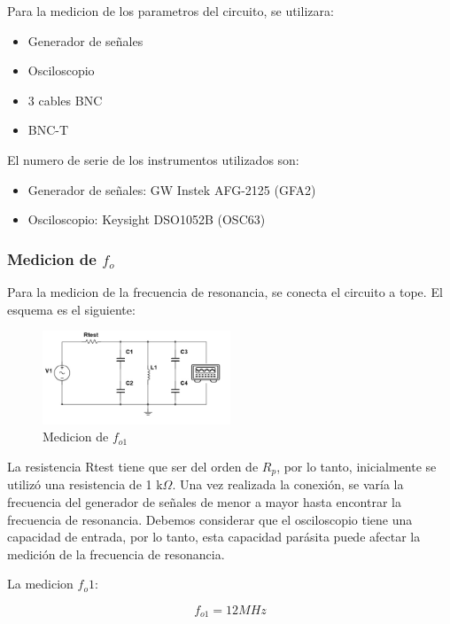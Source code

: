 Para la medicion de los parametros del circuito, se utilizara:

\begin{itemize}
    \item Generador de señales
    \item Osciloscopio
    \item 3 cables BNC
    \item BNC-T 
\end{itemize}

El numero de serie de los instrumentos utilizados son:

\begin{itemize}
    \item Generador de señales: GW Instek AFG-2125 (GFA2)
    \item Osciloscopio: Keysight DSO1052B (OSC63)
\end{itemize}

\subsubsection{Medicion de $f_o$}

Para la medicion de la frecuencia de resonancia, se conecta el circuito a tope. El esquema es el siguiente:

\begin{figure}[H]
    \centering
    \includegraphics[width=0.5\textwidth]{Imagenes/medicion_fo.png}
    \caption{Medicion de $f_{o1}$}

\end{figure}


La resistencia Rtest tiene que ser del orden de  $R_p$, por lo tanto, inicialmente se utilizó una resistencia de 1 k$\Omega$. Una vez realizada la conexión, se varía la frecuencia del generador 
de señales de menor a mayor hasta encontrar la frecuencia de resonancia. Debemos considerar que el osciloscopio tiene una capacidad de entrada, por lo tanto, esta capacidad parásita puede 
afectar la medición de la frecuencia de resonancia.

La medicion $f_o1$:

\begin{equation}
    \boxed{f_{o1} = 12 MHz}
\end{equation}

